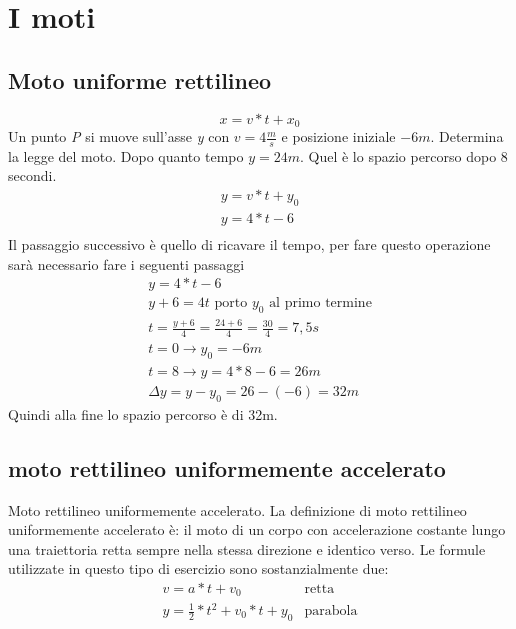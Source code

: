 \chapter{I moti}
\section{Moto uniforme rettilineo}
\begin{equation}
	x=v*t+x_0
\end{equation}
Un punto \textit{P} si muove sull'asse \textit{y} con $v=4\frac{m}{s}$ e
posizione iniziale $-6m$. Determina la legge del moto. Dopo quanto tempo
$y=24m$. Quel è lo spazio percorso dopo 8 secondi.
\begin{equation}
	\begin{matrix}
		y=v*t+y_0\\
		\boxed{y=4*t-6}\\
	\end{matrix}
\end{equation}
Il passaggio successivo è quello di ricavare il tempo, per fare questo
operazione sarà necessario fare i seguenti passaggi
\begin{equation}
	\begin{matrix}
		y=4*t-6\\
		y+6=4t \text{ porto } y_0 \text{ al primo termine}\\
		t=\frac{y+6}{4}=\frac{24+6}{4}=\frac{30}{4}=7,5s\\
		t=0\to y_0=-6m\\
		t=8\to y=4*8-6=26m\\
		\Delta y=y-y_0=26-(-6)=32m
	\end{matrix}
\end{equation}
Quindi alla fine lo spazio percorso è di 32m.
\section{moto rettilineo uniformemente accelerato}
Moto rettilineo uniformemente accelerato. La definizione di moto rettilineo
uniformemente accelerato è: il moto di un corpo con accelerazione costante
lungo una traiettoria retta sempre nella stessa direzione e identico verso. Le
formule utilizzate in questo tipo di esercizio sono sostanzialmente due:
\begin{equation}
	\begin{matrix}
			v=a*t+v_0&\text{retta}\\
			y=\frac{1}{2}*t^2+v_0*t+y_0&\text{parabola}
	\end{matrix}
\end{equation}
